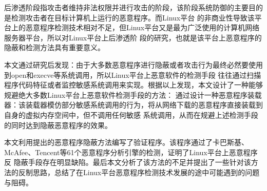 后渗透阶段指攻击者维持非法权限并进行攻击的阶段，该阶段系统防御的主要目的是检测攻击者在目标计算机上运行的恶意程序。而Linux平台
的非商业性导致该平台上的恶意程序检测技术相对不足，但Linux平台又是最为广泛使用的计算机网络服务器平台，所以对Linux平台上后渗透阶
段的研究，也就是该平台上恶意程序的隐蔽和检测方法具有重要意义。

本文通过研究后发现：由于大多数恶意程序进行隐蔽或者攻击行为最终必然要使用到open和execve等系统调用，所以Linux平台上恶意软件的检测手段
往往通过扫描程序代码特征或者监控敏感系统调用来实现。根据以上发现，本文设计了一种能够规避绝大多数Linux平台上恶意软件检测手段的方法：
通过设计一种恶意程序装载器：该装载器模仿部分敏感系统调用的行为，将从网络下载的恶意程序直接装载到自身的虚拟内存空间中，但不调用任何敏感
系统调用，从而在规避上述检测手段的同时达到隐蔽恶意程序的效果。

本文利用提出的恶意程序隐蔽方法编写了验证程序。该程序通过了卡巴斯基、McAfee、Tencent等61个恶意程序分析引擎的检测，证明了Linux平台上恶意程序反
隐蔽手段存在明显缺陷。最后本文分析了该方法的不足并提出了一些针对该方法的反制思路，总结了在Linux平台恶意程序检测技术发展的途中可能遇到的问题与阻碍。


